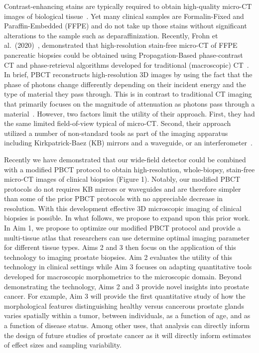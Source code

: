 \documentclass{NIHGrant}
\theoremstyle{theorem}
\begin{document}
Contrast-enhancing stains are typically required to obtain high-quality
micro-CT images of biological tissue~\cite{ding_computational_2019,katz_whole-organism_2021,busse_three-dimensional_2018,metscher_microct_2009}. Yet many clinical samples are
Formalin-Fixed and Paraffin-Embedded (FFPE) and do not take up those stains
without significant alterations to the sample such as deparaffinization. Recently, Frohn et al.~(2020)~\cite{frohn_3d_2020}, demonstrated that high-resolution stain-free
micro-CT of FFPE pancreatic biopsies could be obtained using Propagation-Based
phase-contrast CT and phase-retrieval algorithms developed for traditional
(macroscopic) CT~\cite{mohan_non-linear_2023}. In brief, PBCT reconstructs high-resolution 3D images
by using the fact that the phase of photons change differently depending on
their incident energy and the type of material they pass through. This is in contrast to traditional CT
imaging that primarily focuses on the magnitude of attenuation as photons pass through
a material~\cite{katz_whole-organism_2021,metscher_microct_2009}. However, two factors limit the utility of their approach. First,
they had the same limited field-of-view typical of micro-CT. Second, their
approach utilized a number of non-standard tools as part of the imaging apparatus
including Kirkpatrick-Baez (KB) mirrors and a waveguide, or an interferometer~\cite{frost_3d_2023,polikarpov_towards_2023,riedel_comparing_2023}.

Recently we have demonstrated that our wide-field detector could be combined with a modified PBCT protocol to obtain high-resolution,
whole-biopsy, stain-free micro-CT images of clinical biopsies (Figure 1).
Notably, our modified PBCT protocols do not requires KB mirrors or
waveguides and are therefore simpler than some of the prior PBCT protocols with
no appreciable decrease in resolution. With this development effective 3D
microscopic imaging of clinical biopsies is possible. In what follows, we propose
to expand upon this prior work. In Aim 1, we propose to optimize our modified
PBCT protocol and provide a multi-tissue atlas that researchers can use
determine optimal imaging parameter for different tissue types. Aims 2 and 3
then focus on the application of this technology to imaging prostate biopsies.
Aim 2 evaluates the utility of this technology in clinical settings while Aim 3
focuses on adapting quantitative tools developed for macroscopic morphometrics
to the microscopic domain. Beyond demonstrating the technology, Aims 2 and 3
provide novel insights into prostate cancer. For example, Aim 3 will provide the
first quantitative study of how the morphological features distinguishing
healthy versus cancerous prostate glands varies spatially within a tumor,
between individuals, as a function of age, and as a function of disease status.
Among other uses, that analysis can directly inform the design of future studies
of prostate cancer as it will directly inform estimates of effect sizes and
sampling variability.%
\end{document}
